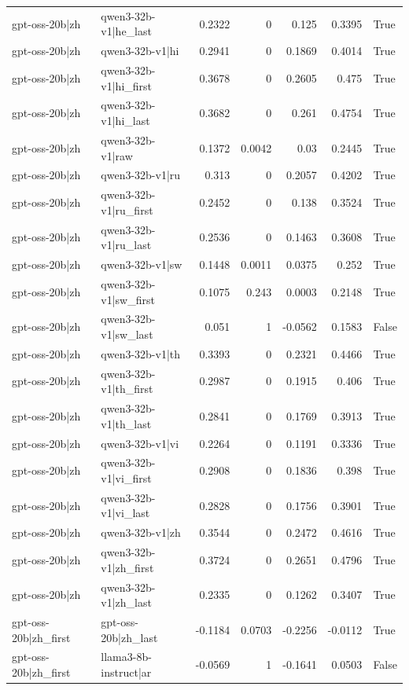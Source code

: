 \begin{table}
\begin{tabular}{l l r r r r l}
gpt-oss-20b|zh & qwen3-32b-v1|he_last & 0.2322 & 0 & 0.125 & 0.3395 & True \\
gpt-oss-20b|zh & qwen3-32b-v1|hi & 0.2941 & 0 & 0.1869 & 0.4014 & True \\
gpt-oss-20b|zh & qwen3-32b-v1|hi_first & 0.3678 & 0 & 0.2605 & 0.475 & True \\
gpt-oss-20b|zh & qwen3-32b-v1|hi_last & 0.3682 & 0 & 0.261 & 0.4754 & True \\
gpt-oss-20b|zh & qwen3-32b-v1|raw & 0.1372 & 0.0042 & 0.03 & 0.2445 & True \\
gpt-oss-20b|zh & qwen3-32b-v1|ru & 0.313 & 0 & 0.2057 & 0.4202 & True \\
gpt-oss-20b|zh & qwen3-32b-v1|ru_first & 0.2452 & 0 & 0.138 & 0.3524 & True \\
gpt-oss-20b|zh & qwen3-32b-v1|ru_last & 0.2536 & 0 & 0.1463 & 0.3608 & True \\
gpt-oss-20b|zh & qwen3-32b-v1|sw & 0.1448 & 0.0011 & 0.0375 & 0.252 & True \\
gpt-oss-20b|zh & qwen3-32b-v1|sw_first & 0.1075 & 0.243 & 0.0003 & 0.2148 & True \\
gpt-oss-20b|zh & qwen3-32b-v1|sw_last & 0.051 & 1 & -0.0562 & 0.1583 & False \\
gpt-oss-20b|zh & qwen3-32b-v1|th & 0.3393 & 0 & 0.2321 & 0.4466 & True \\
gpt-oss-20b|zh & qwen3-32b-v1|th_first & 0.2987 & 0 & 0.1915 & 0.406 & True \\
gpt-oss-20b|zh & qwen3-32b-v1|th_last & 0.2841 & 0 & 0.1769 & 0.3913 & True \\
gpt-oss-20b|zh & qwen3-32b-v1|vi & 0.2264 & 0 & 0.1191 & 0.3336 & True \\
gpt-oss-20b|zh & qwen3-32b-v1|vi_first & 0.2908 & 0 & 0.1836 & 0.398 & True \\
gpt-oss-20b|zh & qwen3-32b-v1|vi_last & 0.2828 & 0 & 0.1756 & 0.3901 & True \\
gpt-oss-20b|zh & qwen3-32b-v1|zh & 0.3544 & 0 & 0.2472 & 0.4616 & True \\
gpt-oss-20b|zh & qwen3-32b-v1|zh_first & 0.3724 & 0 & 0.2651 & 0.4796 & True \\
gpt-oss-20b|zh & qwen3-32b-v1|zh_last & 0.2335 & 0 & 0.1262 & 0.3407 & True \\
gpt-oss-20b|zh_first & gpt-oss-20b|zh_last & -0.1184 & 0.0703 & -0.2256 & -0.0112 & True \\
gpt-oss-20b|zh_first & llama3-8b-instruct|ar & -0.0569 & 1 & -0.1641 & 0.0503 & False \\

\end{tabular}
\end{table}
